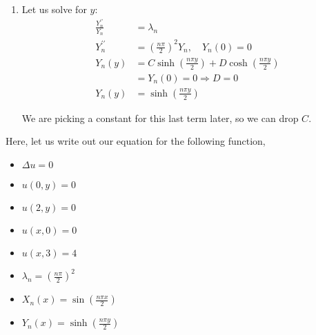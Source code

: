 \begin{enumerate}
  \item Let us solve for $y$:
  \begin{align}
    \frac{Y^{\prime\prime}_n}{Y_n} & = \lambda_n\\
    Y^{\prime\prime}_n
    & = \left(\frac{n \pi}{2}\right)^2 Y_n, \quad Y_n(0) = 0\\
    Y_n(y)
    & = C \sinh \left( \frac{n \pi y}{2} \right)
    + D \cosh \left( \frac{n \pi y}{2} \right)\\
    & = Y_n(0) = 0 \Rightarrow D = 0\\
    Y_n(y) & = \sinh \left( \frac{n \pi y}{2} \right)
  \end{align}

  We are picking a constant for this last term later, so we can drop $C$.
\end{enumerate}

Here, let us write out our equation for the following function,

\begin{itemize}
  \item $\Delta u = 0$
  \item $u(0, y) = 0$
  \item $u(2, y) = 0$
  \item $u(x, 0) = 0$
  \item $u(x, 3) = 4$
  \item $\lambda_n = \left(\frac{n \pi}{2}\right)^2$
  \item $X_n(x) = \sin\left(\frac{n \pi x}{2}\right)$
  \item $Y_n(x) = \sinh\left(\frac{n \pi y}{2}\right)$
\end{itemize}

